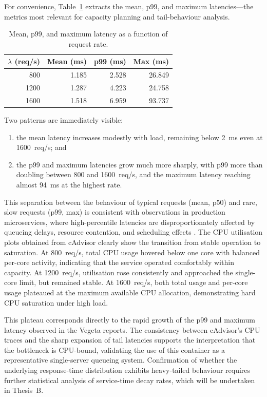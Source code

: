 For convenience, Table~\ref{tab:vegeta-mean-p99} extracts the mean,
p99, and maximum latencies---the metrics most relevant for capacity
planning and tail-behaviour analysis.

\begin{table}[h]
\centering
\caption{Mean, p99, and maximum latency as a function of request rate.}
\label{tab:vegeta-mean-p99}
\begin{tabular}{rrrr}
\toprule
$\lambda$ (req/s) & Mean (ms) & p99 (ms) & Max (ms) \\
\midrule
 800  & 1.185 & 2.528 & 26.849 \\
1200  & 1.287 & 4.223 & 24.758 \\
1600  & 1.518 & 6.959 & 93.737 \\
\bottomrule
\end{tabular}
\end{table}

Two patterns are immediately visible:

\begin{enumerate}
    \item the mean latency increases modestly with load, remaining below
    2~ms even at 1600~req/s; and
    \item the p99 and maximum latencies grow much more sharply, with
    p99 more than doubling between 800 and 1600~req/s, and the maximum
    latency reaching almost 94~ms at the highest rate.
\end{enumerate}

This separation between the behaviour of typical requests (mean, p50) and rare, slow requests (p99, max) is consistent with observations in production microservices, where high-percentile latencies are disproportionately affected by queueing delays, resource contention, and scheduling effects \cite{DeanBarroso2013}. The CPU utilisation plots obtained from cAdvisor clearly show the transition from stable operation to saturation. At 800~req/s, total CPU usage hovered below one core with balanced per-core activity, indicating that the service operated comfortably within capacity. At 1200~req/s, utilisation rose consistently and approached the single-core limit, but remained stable. At 1600~req/s, both total usage and per-core usage plateaued at the maximum available CPU allocation, demonstrating hard CPU saturation under high load.

This plateau corresponds directly to the rapid growth of the p99 and maximum latency observed in the Vegeta reports. The consistency between cAdvisor’s CPU traces and the sharp expansion of tail latencies supports the interpretation that the bottleneck is CPU-bound, validating the use of this container as a representative single-server queueing system. Confirmation of whether the underlying response-time distribution exhibits heavy-tailed behaviour requires further statistical analysis of service-time decay rates, which will be undertaken in Thesis~B.

